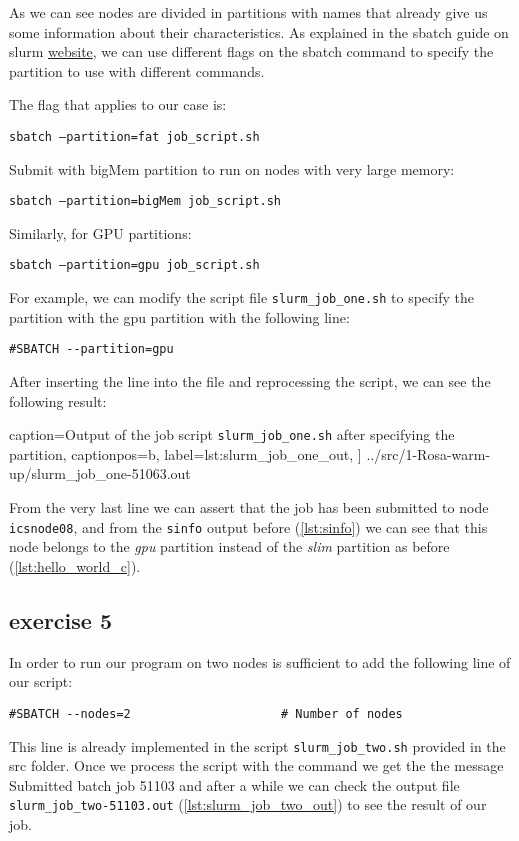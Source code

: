 \documentclass[unicode,11pt,a4paper,oneside,numbers=endperiod,openany]{scrartcl}
\begin{document}
As we can see nodes are divided in partitions with names that already give us some information about their characteristics.
As explained in the sbatch guide on slurm \href{https://slurm.schedmd.com/sbatch.html}{website}, we can use different flags on the sbatch command to specify the partition to use with different commands.


The flag that applies to our case is:

\quad\quad\texttt{sbatch --partition=fat job\_script.sh}

Submit with bigMem partition to run on nodes with very large memory:

\quad\quad\texttt{sbatch --partition=bigMem job\_script.sh}

Similarly, for GPU partitions:

\quad\quad\texttt{sbatch --partition=gpu job\_script.sh}

For example, we can modify the script file \texttt{slurm\_job\_one.sh} to specify the partition with the gpu partition with the following line:
\begin{verbatim}
#SBATCH --partition=gpu
\end{verbatim}

After inserting the line into the file and reprocessing the script, we can see the following result:


    caption={Output of the job script \texttt{slurm\_job\_one.sh} after specifying the partition},
    captionpos=b,
    label={lst:slurm_job_one_out},
]
{../src/1-Rosa-warm-up/slurm_job_one-51063.out}

From the very last line we can assert that the job has been submitted to node \texttt{icsnode08}, and from the \texttt{sinfo} output before (\ref{lst:sinfo}) we can see that this node belongs to the \textit{gpu} partition instead of the \textit{slim} partition as before (\ref{lst:hello_world_c}).

\subsection{exercise 5}

In order to run our program on two nodes is sufficient to add the following line of our script:
\begin{verbatim}
#SBATCH --nodes=2                     # Number of nodes
\end{verbatim}
This line is already implemented in the script \texttt{slurm\_job\_two.sh} provided in the src folder. Once we process the script with the command we get the the message Submitted batch job 51103 and after a while we can check the output file \texttt{slurm\_job\_two-51103.out} (\ref{lst:slurm_job_two_out}) to see the result of our job.
\end{document}
